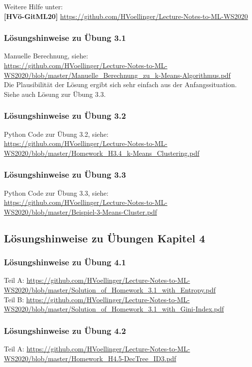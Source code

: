 \documentclass[12pt]{article}
\begin{document}
Weitere Hilfe unter: \\
\textbf{[HVö-GitML20]} \url{https://github.com/HVoellinger/Lecture-Notes-to-ML-WS2020}
 
\subsubsection{Lösungshinweise zu Übung 3.1}
Manuelle Berechnung, siehe:\\
\url{https://github.com/HVoellinger/Lecture-Notes-to-ML-WS2020/blob/master/Manuelle_Berechnung_zu_k-Means-Algorithmus.pdf}\\[0.2cm]
Die Plausibilität der Lösung ergibt sich sehr einfach aus der Anfangssituation. Siehe auch Lösung zur Übung 3.3.

\subsubsection{Lösungshinweise zu Übung 3.2} 

Python Code zur Übung 3.2, siehe:\\
\url{https://github.com/HVoellinger/Lecture-Notes-to-ML-WS2020/blob/master/Homework_H3.4_k-Means_Clustering.pdf}

\subsubsection{Lösungshinweise zu Übung 3.3} 

Python Code zur Übung 3.3, siehe:\\
\url{https://github.com/HVoellinger/Lecture-Notes-to-ML-WS2020/blob/master/Beispiel-3-Means-Cluster.pdf}


\newpage

\subsection{Lösungshinweise zu Übungen Kapitel 4}

\subsubsection{Lösungshinweise zu Übung 4.1}
%
Teil A: \url{https://github.com/HVoellinger/Lecture-Notes-to-ML-WS2020/blob/master/Solution_of_Homework_3.1_with_Entropy.pdf}
\\[0.2cm]
%
Teil B: \url{https://github.com/HVoellinger/Lecture-Notes-to-ML-WS2020/blob/master/Solution_of_Homework_3.1_with_Gini-Index.pdf}
%
\subsubsection{Lösungshinweise zu Übung 4.2}
%
Teil A: \url{https://github.com/HVoellinger/Lecture-Notes-to-ML-WS2020/blob/master/Homework_H4.5-DecTree_ID3.pdf}
%
\end{document}
